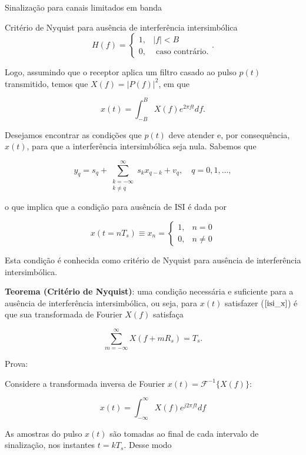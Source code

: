 \documentclass[
  ignorenonframetext,
]{beamer}
\begin{document}
\begin{frame}{Sinalização para canais limitados em banda}
\begin{block}{Critério de Nyquist para ausência de interferência
intersimbólica}
\begin{equation}
H(f) = \begin{cases}1, & |f|<B \\ 0, & \text { caso contrário.}\end{cases}.
\end{equation}

Logo, assumindo que o receptor aplica um filtro casado ao pulso \(p(t)\)
transmitido, temos que \(X(f) = |P(f)|^2\), em que

\begin{equation}
x(t) = \int_{-B}^{B}X(f)e^{2\pi f t} df.
\end{equation}

Desejamos encontrar as condições que \(p(t)\) deve atender e, por
consequência, \(x(t)\), para que a interferência intersimbólica seja
nula. Sabemos que

\begin{equation}\label{ISI_eq2}
y_q=s_q + \sum_{\substack{k=-\infty \\ k \neq q}}^{\infty} s_k x_{q-k} + v_q, \quad q=0,1, \ldots,
\end{equation}

o que implica que a condição para ausência de ISI é dada por

\begin{equation}\label{isi_x}
x(t=n T_s) \equiv x_n= \begin{cases}1, & n=0 \\ 0, & n \neq 0\end{cases}
\end{equation}

Esta condição é conhecida como critério de Nyquist para ausência de
interferência intersimbólica.

\textbf{Teorema (Critério de Nyquist)}: uma condição necessária e
suficiente para a ausência de interferência intersimbólica, ou seja,
para \(x(t)\) satisfazer (\(\ref{isi_x}\)) é que sua transformada de
Fourier \(X(f)\) satisfaça

\[
\sum_{m=-\infty}^{\infty} X(f+m R_s)=T_s.
\]

Prova:

Considere a transformada inversa de Fourier
\(x(t) = \mathcal{F}^{-1}\{X(f)\}\):

\begin{equation}
x(t)=\int_{-\infty}^{\infty} X(f) e^{j 2 \pi f t} d f
\end{equation}

As amostras do pulso \(x(t)\) são tomadas ao final de cada intervalo de
sinalização, nos instantes \(t=kT_s\). Desse modo


\end{block}
\end{frame}
\end{document}
